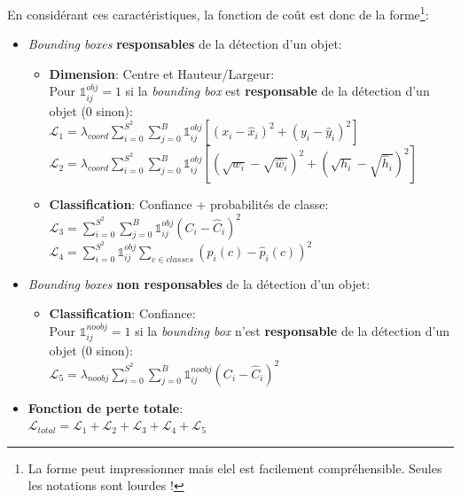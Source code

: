 \noindent En considérant ces caractéristiques, la fonction de coût est donc de la forme\footnote{La forme peut impressionner mais elel est facilement compréhensible. Seules les notations sont lourdes !}:
\begin{itemize}
    \item \textit{Bounding boxes} \textbf{responsables} de la détection d'un objet:\\
    \begin{itemize}
        \item \textbf{Dimension}: Centre et Hauteur/Largeur:\\

        Pour $\mathds{1}_{ij}^{obj}=1$ si la \textit{bounding box} est \textbf{responsable} de la détection d'un objet (0 sinon):\\

        $\mathcal{L}_1=\lambda_{coord}\sum_{i=0}^{S^2}\sum_{j=0}^{B}\mathds{1}_{ij}^{obj}[(x_i-\hat{x}_i)^2+(y_i-\hat{y}_i)^2]$ \\
        $\mathcal{L}_2=\lambda_{coord}\sum_{i=0}^{S^2}\sum_{j=0}^{B}\mathds{1}_{ij}^{obj}[(\sqrt{w_i}-\sqrt{\hat{w}_i})^2+(\sqrt{h_i}-\sqrt{\hat{h}_i})^2]$\\

        \item \textbf{Classification}: Confiance + probabilités de classe:\\

        $\mathcal{L}_3=\sum_{i=0}^{S^2}\sum_{j=0}^{B}\mathds{1}_{ij}^{obj}(C_i-\hat{C}_i)^2$\\
        $\mathcal{L}_4=\sum_{i=0}^{S^2}\mathds{1}_{ij}^{obj}\sum_{c \in classes}(p_i(c)-\hat{p}_i(c))^2$\\
    \end{itemize}

    \item \textit{Bounding boxes} \textbf{non responsables} de la détection d'un objet:\\
    \begin{itemize}
        \item \textbf{Classification}: Confiance:\\

        Pour $\mathds{1}_{ij}^{noobj}=1$ si la \textit{bounding box} n'est \textbf{responsable} de la détection d'un objet (0 sinon):\\

        $\mathcal{L}_5=\lambda_{noobj}\sum_{i=0}^{S^2}\sum_{j=0}^{B}\mathds{1}_{ij}^{noobj}(C_i-\hat{C}_i)^2$\\
    \end{itemize}

    \item \textbf{Fonction de perte totale}:\\

    $\mathcal{L}_{total}=\mathcal{L}_1+\mathcal{L}_2+\mathcal{L}_3+\mathcal{L}_4+\mathcal{L}_5$\\
\end{itemize}

